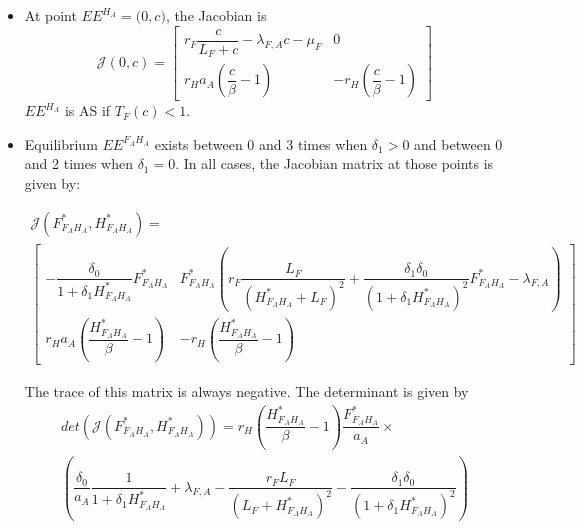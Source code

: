 \documentclass{article}
\newcommand{\lfa}{\lambda_{F, A}}
\begin{document}
\begin{itemize}
\item At point $EE^{H_A} = \Big(0,c \Big)$, the Jacobian is
\begin{equation}
\mathcal{J}(0,c) = \begin{bmatrix}
r_F \dfrac{c}{L_F +c} - \lfa c - \mu_F & 0 \\
r_H a_A (\dfrac{c}{\beta} - 1) & -r_H(\dfrac{c}{\beta} - 1)
\end{bmatrix}
\end{equation}
$EE^{H_A}$ is AS if $T_F(c) < 1$.


\item Equilibrium $EE^{F_AH_A}$ exists between 0 and 3 times when $\delta_1 > 0$ and between 0 and 2 times when $\delta_1=0$. In all cases, the Jacobian matrix at those points is given by:

\begin{multline}
\mathcal{J}(F^*_{F_AH_A}, H^*_{F_AH_A}) = \\ \begin{bmatrix}
- \dfrac{\delta_0}{1 + \delta_1 H^*_{F_AH_A}}F^*_{F_AH_A} & F^*_{F_AH_A} \left(r_F \dfrac{L_F}{(H^*_{F_AH_A} + L_F)^2} + \dfrac{\delta_1 \delta_0}{(1 + \delta_1 H^*_{F_AH_A})^2}F^*_{F_AH_A} - \lfa \right) \\
r_H a_A (\dfrac{H^*_{F_AH_A}}{\beta} - 1) & -r_H(\dfrac{H^*_{F_AH_A}}{\beta} - 1)
\end{bmatrix}
\end{multline}

The trace of this matrix is always negative. The determinant is given by
\begin{multline}
det(\mathcal{J}(F^*_{F_AH_A}, H^*_{F_AH_A})) = r_H \left(\dfrac{H^*_{F_AH_A}}{\beta} - 1 \right) \dfrac{F^*_{F_AH_A}}{a_A} \times \\\left(\dfrac{\delta_0}{a_A} \dfrac{1}{1 + \delta_1 H^*_{F_AH_A}} + \lfa - \dfrac{r_F L_F}{(L_F + H^*_{F_AH_A})^2} - \dfrac{\delta_1 \delta_0}{(1+ \delta_1H^*_{F_AH_A})^2}\right)
\end{multline}


\end{itemize}
\end{document}
